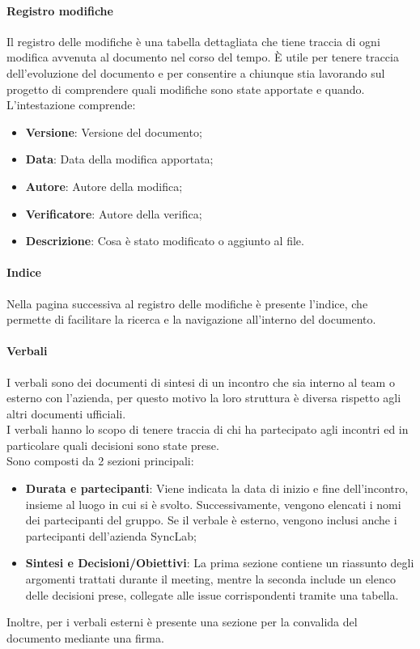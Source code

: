 \documentclass[10pt]{article}
\begin{document}
\begin{justify}
        \paragraph{Registro modifiche}
        Il registro delle modifiche è una tabella dettagliata che tiene traccia di ogni modifica avvenuta al documento nel corso del tempo. È utile per tenere traccia dell'evoluzione del documento e per consentire a chiunque stia lavorando sul progetto di comprendere quali modifiche sono state apportate e quando.
        L'intestazione comprende:
        \begin{itemize}
            \item \textbf{Versione}: Versione del documento;
            \item \textbf{Data}: Data della modifica apportata;
            \item \textbf{Autore}: Autore della modifica;
            \item \textbf{Verificatore}: Autore della verifica;
            \item \textbf{Descrizione}: Cosa è stato modificato o aggiunto al file.
        \end{itemize}

        \paragraph{Indice}
        Nella pagina successiva al registro delle modifiche è presente l'indice, che permette di facilitare la ricerca e la navigazione all'interno del documento.\\

        \paragraph{Verbali}
        I verbali sono dei documenti di sintesi di un incontro che sia interno al team o esterno con l'azienda, per questo motivo la loro struttura è diversa rispetto agli altri documenti ufficiali.\\
        I verbali hanno lo scopo di tenere traccia di chi ha partecipato agli incontri ed in particolare quali decisioni sono state prese.\\
        Sono composti da 2 sezioni principali:
        \begin{itemize}
            \item \textbf{Durata e partecipanti}: Viene indicata la data di inizio e fine dell'incontro, insieme al luogo in cui si è svolto. Successivamente, vengono elencati i nomi dei partecipanti del gruppo. Se il verbale è esterno, vengono inclusi anche i partecipanti dell'azienda SyncLab;
            \item \textbf{Sintesi e Decisioni/Obiettivi}: La prima sezione contiene un riassunto degli argomenti trattati durante il meeting, mentre la seconda include un elenco delle decisioni prese, collegate alle issue corrispondenti tramite una tabella.
        \end{itemize}
        Inoltre, per i verbali esterni è presente una sezione per la convalida del documento mediante una firma.\\


\end{justify}
\end{document}
